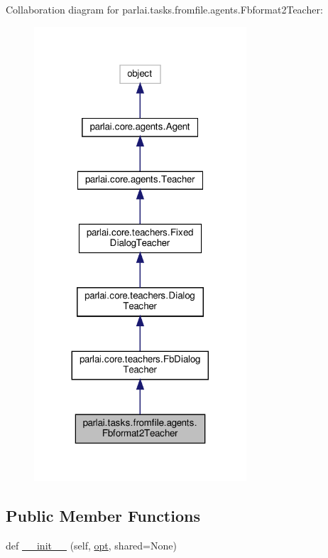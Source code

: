 Collaboration diagram for parlai.\+tasks.\+fromfile.\+agents.\+Fbformat2\+Teacher\+:\nopagebreak
\begin{figure}[H]
\begin{center}
\leavevmode
\includegraphics[width=224pt]{d5/d9e/classparlai_1_1tasks_1_1fromfile_1_1agents_1_1Fbformat2Teacher__coll__graph}
\end{center}
\end{figure}
\subsection*{Public Member Functions}
\begin{DoxyCompactItemize}
\item 
def \hyperlink{classparlai_1_1tasks_1_1fromfile_1_1agents_1_1Fbformat2Teacher_ab1420f53e945bfec70105e1e90f62580}{\+\_\+\+\_\+init\+\_\+\+\_\+} (self, \hyperlink{classparlai_1_1core_1_1teachers_1_1FbDialogTeacher_af7a9ec497b9cd0292d7b8fa220da7c28}{opt}, shared=None)
\end{DoxyCompactItemize}
